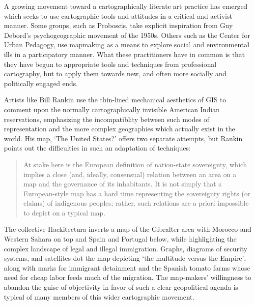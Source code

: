 \documentclass[11pt,oneside,notitlepage]{report}
\begin{document}
A growing movement toward a cartographically literate art practice has emerged which seeks to use cartographic tools and attitudes in a critical and activist manner. Some groups, such as Proboscis, take explicit inspiration from Guy Debord's psychogeographic movement of the 1950s. Others such as the Center for Urban Pedagogy, use mapmaking as a means to explore social and environmental ills in a participatory manner. What these practitioners have in common is that they have begun to appropriate tools and techniques from professional cartography, but to apply them towards new, and often more socially and politically engaged ends. 

Artists like Bill Rankin use the thin-lined mechanical aesthetics of GIS to comment upon the normally cartographically invisible American Indian reservations, emphasizing the incompatiblity between such modes of representation and the more complex geographies which actually exist in the world. His map, `The United States?' offers two separate attempts, but Rankin points out the difficulties in such an adaptation of techniques:

\begin{quote}
At stake here is the European definition of nation-state sovereignty, which implies a close (and, ideally, consensual) relation between an area on a map and the governance of its inhabitants. It is not simply that a European-style map has a hard time representing the sovereignty rights (or claims) of indigenous peoples; rather, such relations are a priori impossible to depict on a typical map. \cite{rankin2003reservations}
\end{quote}

The collective Hackitectura inverts a map of the Gibralter area with Morocco and Western Sahara on top and Spain and Portugal below, while highlighting the complex landscape of legal and illegal immigration. Graphs, diagrams of security systems, and satellites dot the map depicting `the multitude versus the Empire', along with marks for immigrant detainment and the Spanish tomato farms whose need for cheap labor feeds much of the migration. The map-makers' willingness to abandon the guise of objectivity in favor of such a clear geopolitical agenda is typical of many members of this wider cartographic movement.  
\end{document}

